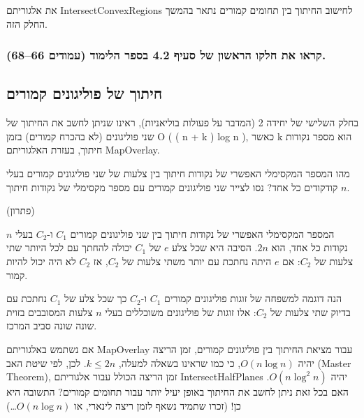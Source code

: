 \documentclass[
]{book}
\begin{document}
את אלגוריתם IntersectConvexRegions לחישוב החיתוך בין תחומים קמורים נתאר בהמשך החלק הזה.

\hypertarget{ux5e7ux5e8ux5d0ux5d5-ux5d0ux5ea-ux5d7ux5dcux5e7ux5d5-ux5d4ux5e8ux5d0ux5e9ux5d5ux5df-ux5e9ux5dc-ux5e1ux5e2ux5d9ux5e3-4.2-ux5d1ux5e1ux5e4ux5e8-ux5d4ux5dcux5d9ux5deux5d5ux5d3-ux5e2ux5deux5d5ux5d3ux5d9ux5dd-6668.}{%
\subsubsection*{קראו את חלקו הראשון של סעיף 4.2 בספר הלימוד (עמודים 66--68).}\label{ux5e7ux5e8ux5d0ux5d5-ux5d0ux5ea-ux5d7ux5dcux5e7ux5d5-ux5d4ux5e8ux5d0ux5e9ux5d5ux5df-ux5e9ux5dc-ux5e1ux5e2ux5d9ux5e3-4.2-ux5d1ux5e1ux5e4ux5e8-ux5d4ux5dcux5d9ux5deux5d5ux5d3-ux5e2ux5deux5d5ux5d3ux5d9ux5dd-6668.}}

\hypertarget{ux5d7ux5d9ux5eaux5d5ux5da-ux5e9ux5dc-ux5e4ux5d5ux5dcux5d9ux5d2ux5d5ux5e0ux5d9ux5dd-ux5e7ux5deux5d5ux5e8ux5d9ux5dd}{%
\subsection{חיתוך של פוליגונים קמורים}\label{ux5d7ux5d9ux5eaux5d5ux5da-ux5e9ux5dc-ux5e4ux5d5ux5dcux5d9ux5d2ux5d5ux5e0ux5d9ux5dd-ux5e7ux5deux5d5ux5e8ux5d9ux5dd}}

בחלק השלישי של יחידה 2 (המדבר על פעולות בוליאניות), ראינו שניתן לחשב את החיתוך של שני פוליגונים (לא בהכרח קמורים) בזמן O ( ( n + k ) log n ), כאשר k הוא מספר נקודות חיתוך, בעזרת האלגוריתם MapOverlay.

מהו המספר המקסימלי האפשרי של נקודות חיתוך בין צלעות של שני פוליגונים קמורים בעלי \(n\) קודקודים כל אחד? נסו לצייר שני פוליגונים קמורים עם מספר מקסימלי של נקודות חיתוך.

(פתרון)

המספר המקסימלי האפשרי של נקודות חיתוך בין שני פוליגונים קמורים \(C_1\) ו-\(C_2\) בעלי
\(n\) נקודות כל אחד, הוא
\(2 n\). הסיבה היא שכל צלע \(e\) של \(C_1\) יכולה להחתך עם לכל היותר שתי צלעות של \(C_2\): אם \(e\) היתה נחתכת עם יותר משתי צלעות של \(C_2\), אז \(C_2\) לא היה יכול להיות קמור.

הנה דוגמה למשפחה של זוגות פוליגונים קמורים \(C_1\) ו-\(C_2\) כך שכל צלע של \(C_1\) נחתכת עם בדיוק שתי צלעות של \(C_2\): אלו זוגות של פוליגונים משוכללים בעלי \(n\) צלעות המסובבים בזוית שונה שונה סביב המרכז.

אם נשתמש באלגוריתם MapOverlay עבור מציאת החיתוך בין פוליגונים קמורים, זמן הריצה יהיה \(O ( n \log n )\), כי כמו שראינו בשאלה למעלה, \(k \le 2 n\). לכן, לפי שיטת האב (Master Theorem), זמן הריצה הכולל עבור אלגוריתם IntersectHalfPlanes יהיה \(O ( n \log^2 n )\). האם בכל זאת ניתן לחשב את החיתוך באופן יעיל יותר עבור תחומים קמורים? התשובה היא כן! (זכרו שתמיד נשאף לזמן ריצה לינארי, או \(O ( n \log n )\)\ldots)
\end{document}
